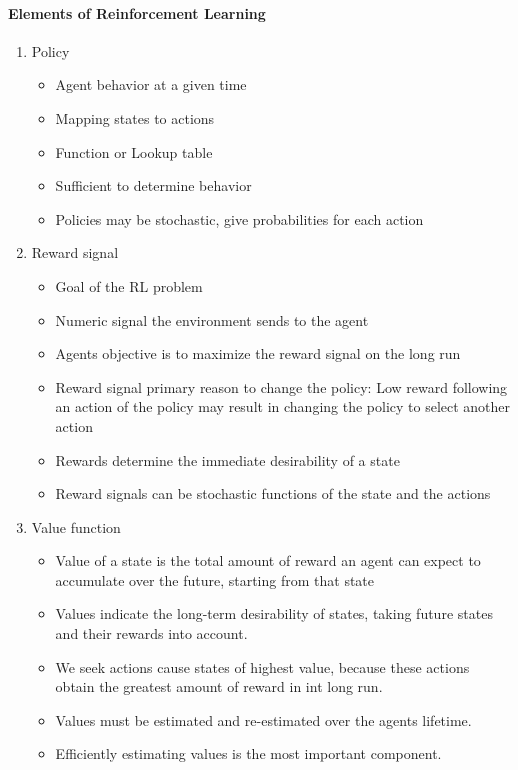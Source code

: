\documentclass[a4paper, twoside, 12pt]{article}
\begin{document}
\paragraph{Elements of Reinforcement Learning}
\label{sec:orgc7a8ac6}
\begin{enumerate}
\item Policy
\label{sec:org3454fb8}
\begin{itemize}
\item Agent behavior at a given time
\item Mapping states to actions
\item Function or Lookup table
\item Sufficient to determine behavior
\item Policies may be stochastic, give probabilities for each action
\end{itemize}
\item Reward signal
\label{sec:orge197453}
\begin{itemize}
\item Goal of the RL problem
\item Numeric signal the environment sends to the agent
\item Agents objective is to maximize the reward signal on the long run
\item Reward signal primary reason to change the policy: Low reward following an
action of the policy may result in changing the policy to select another action
\item Rewards determine the immediate desirability of a state
\item Reward signals can be stochastic functions of the state and the actions
\end{itemize}
\item Value function
\label{sec:orgc5d911d}
\begin{itemize}
\item Value of a state is the total amount of reward an agent can expect to
accumulate over the future, starting from that state
\item Values indicate the long-term desirability of states, taking future states and
their rewards into account.
\item We seek actions cause states of highest value, because these actions obtain
the greatest amount of reward in int long run.
\item Values must be estimated and re-estimated over the agents lifetime.
\item Efficiently estimating values is the most important component.

\end{itemize}
\end{enumerate}
\end{document}
